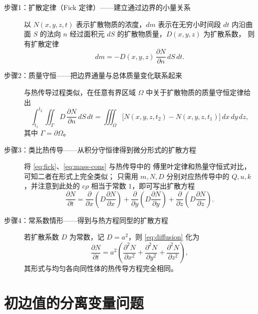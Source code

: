 
\begin{description}

  \item[步骤1：扩散定律（Fick 定律）——建立通过边界的小量关系]
  以 $N(x,y,z,t)$ 表示扩散物质的浓度，$dm$ 表示在无穷小时间段 $dt$
  内沿曲面 $S$ 的法向 $n$ 经过面积元 $dS$ 的扩散物质量，$D(x,y,z)$ 为扩散系数，
  则有扩散定律
  \begin{equation}\label{eq:fick}
    dm = -D(x,y,z)\,\frac{\partial N}{\partial n}\,dS\,dt. \tag{1.17}
  \end{equation}

  \item[步骤2：质量守恒——把边界通量与总体质量变化联系起来]
  与热传导过程类似，在任意有界区域 $\Omega$ 中关于扩散物质的质量守恒定律给出
  \begin{equation}\label{eq:mass-cons}
    \int_{t_1}^{t_2}\iint_{\Gamma}
      D\,\frac{\partial N}{\partial n}\,dS\,dt
    =\iiint_{\Omega}\bigl[N(x,y,z,t_2)-N(x,y,z,t_1)\bigr]\,
      dx\,dy\,dz, \tag{1.18}
  \end{equation}
  其中 $\Gamma=\partial\Omega$。

  \item[步骤3：类比热传导——从积分守恒律得到微分形式的扩散方程]
  将 \eqref{eq:fick}、\eqref{eq:mass-cons} 与热传导中的
  傅里叶定律和热量守恒式对比，可知二者在形式上完全类似；
  只需用 $m,N,D$ 分别对应热传导中的 $Q,u,k$，并注意到此处的 $c\rho$
  相当于常数 $1$，即可写出扩散方程
  \begin{equation}\label{eq:diffusion}
    \frac{\partial N}{\partial t}
    =\frac{\partial}{\partial x}\!\left(D\frac{\partial N}{\partial x}\right)
    +\frac{\partial}{\partial y}\!\left(D\frac{\partial N}{\partial y}\right)
    +\frac{\partial}{\partial z}\!\left(D\frac{\partial N}{\partial z}\right).
    \tag{1.19}
  \end{equation}

  \item[步骤4：常系数情形——得到与热方程同型的扩散方程]
  若扩散系数 $D$ 为常数，记 $D=a^{2}$，则 \eqref{eq:diffusion} 化为
  \[
    \frac{\partial N}{\partial t}
    =a^{2}\left(
      \frac{\partial^{2}N}{\partial x^{2}}
      +\frac{\partial^{2}N}{\partial y^{2}}
      +\frac{\partial^{2}N}{\partial z^{2}}
    \right),
  \]
  其形式与均匀各向同性体的热传导方程完全相同。
\end{description}
\section{初边值的分离变量问题}

